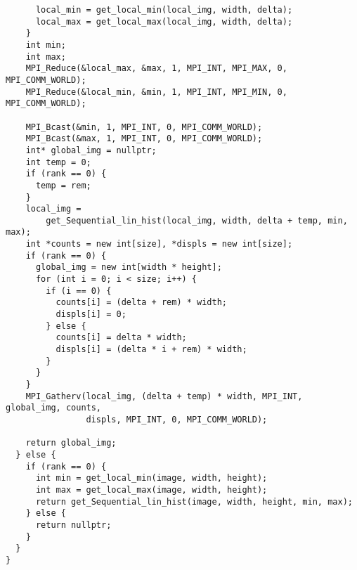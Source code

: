 \documentclass{report}
\begin{document}
\begin{lstlisting}
      local_min = get_local_min(local_img, width, delta);
      local_max = get_local_max(local_img, width, delta);
    }
    int min;
    int max;
    MPI_Reduce(&local_max, &max, 1, MPI_INT, MPI_MAX, 0, MPI_COMM_WORLD);
    MPI_Reduce(&local_min, &min, 1, MPI_INT, MPI_MIN, 0, MPI_COMM_WORLD);

    MPI_Bcast(&min, 1, MPI_INT, 0, MPI_COMM_WORLD);
    MPI_Bcast(&max, 1, MPI_INT, 0, MPI_COMM_WORLD);
    int* global_img = nullptr;
    int temp = 0;
    if (rank == 0) {
      temp = rem;
    }
    local_img =
        get_Sequential_lin_hist(local_img, width, delta + temp, min, max);
    int *counts = new int[size], *displs = new int[size];
    if (rank == 0) {
      global_img = new int[width * height];
      for (int i = 0; i < size; i++) {
        if (i == 0) {
          counts[i] = (delta + rem) * width;
          displs[i] = 0;
        } else {
          counts[i] = delta * width;
          displs[i] = (delta * i + rem) * width;
        }
      }
    }
    MPI_Gatherv(local_img, (delta + temp) * width, MPI_INT, global_img, counts,
                displs, MPI_INT, 0, MPI_COMM_WORLD);

    return global_img;
  } else {
    if (rank == 0) {
      int min = get_local_min(image, width, height);
      int max = get_local_max(image, width, height);
      return get_Sequential_lin_hist(image, width, height, min, max);
    } else {
      return nullptr;
    }
  }
}

\end{lstlisting}
\newpage
\end{document}
